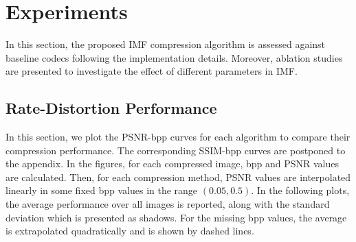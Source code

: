 \section{Experiments} \label{sec: experiments}

In this section, the proposed IMF compression algorithm is assessed against baseline codecs following the implementation details. Moreover, ablation studies are presented to investigate the effect of different parameters in IMF.

\subsection{Rate-Distortion Performance} \label{sec: rate_distortion_performance}
In this section, we plot the PSNR-bpp curves for each algorithm to compare their compression performance. The corresponding SSIM-bpp curves are postponed to the appendix.
In the figures, for each compressed image, bpp and PSNR values are calculated. Then, for each compression method, PSNR values are interpolated linearly in some fixed bpp values in the range $(0.05, 0.5)$. 
In the following plots, the average performance over all images is reported, along with the standard deviation which is presented as shadows.
For the missing bpp values, the average is extrapolated quadratically and is shown by dashed lines.

